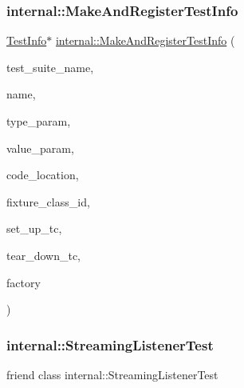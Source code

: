 \subsubsection{\texorpdfstring{internal\+::\+Make\+And\+Register\+Test\+Info}{internal::MakeAndRegisterTestInfo}}
{\footnotesize\ttfamily \hyperlink{classtesting_1_1TestInfo}{Test\+Info}$\ast$ \hyperlink{namespacetesting_1_1internal_a7ab4072540184e26119ad853f45059f7}{internal\+::\+Make\+And\+Register\+Test\+Info} (\begin{DoxyParamCaption}\item[{const char $\ast$}]{test\+\_\+suite\+\_\+name,  }\item[{const char $\ast$}]{name,  }\item[{const char $\ast$}]{type\+\_\+param,  }\item[{const char $\ast$}]{value\+\_\+param,  }\item[{\hyperlink{structtesting_1_1internal_1_1CodeLocation}{internal\+::\+Code\+Location}}]{code\+\_\+location,  }\item[{\hyperlink{namespacetesting_1_1internal_ab1114197d3c657d8b7f8e0c5caa12d00}{internal\+::\+Type\+Id}}]{fixture\+\_\+class\+\_\+id,  }\item[{\hyperlink{namespacetesting_1_1internal_a83e4e0732ac6a9dcfe6ee299dc1b9fa2}{internal\+::\+Set\+Up\+Test\+Suite\+Func}}]{set\+\_\+up\+\_\+tc,  }\item[{\hyperlink{namespacetesting_1_1internal_a8257a87aa42cebaa54b0c48a6ae657a5}{internal\+::\+Tear\+Down\+Test\+Suite\+Func}}]{tear\+\_\+down\+\_\+tc,  }\item[{\hyperlink{classtesting_1_1internal_1_1TestFactoryBase}{internal\+::\+Test\+Factory\+Base} $\ast$}]{factory }\end{DoxyParamCaption})\hspace{0.3cm}{\ttfamily [friend]}}

\mbox{\label{classtesting_1_1TestInfo_adc037d188dab349a94868991955c9cd4}} 
\subsubsection{\texorpdfstring{internal\+::\+Streaming\+Listener\+Test}{internal::StreamingListenerTest}}
{\footnotesize\ttfamily friend class internal\+::\+Streaming\+Listener\+Test\hspace{0.3cm}{\ttfamily [friend]}}

